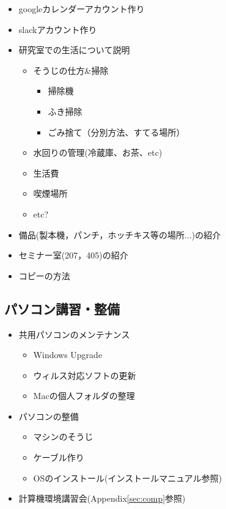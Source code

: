 \documentclass[twocolumn,11pt]{jsarticle}
\begin{document}
\begin{itemize}
\item googleカレンダーアカウント作り
\item slackアカウント作り
\item 研究室での生活について説明
  \begin{itemize}
  \item そうじの仕方\&掃除
    \begin{itemize}
    \item 掃除機
    \item ふき掃除
    \item ごみ捨て（分別方法、すてる場所）	
    \end{itemize}
  \item 水回りの管理(冷蔵庫、お茶、etc)
  \item 生活費
  \item 喫煙場所
  \item etc?
  \end{itemize}
\item 備品(製本機，パンチ，ホッチキス等の場所...)の紹介
\item セミナー室(207，405)の紹介
\item コピーの方法
\end{itemize}


\subsection{パソコン講習・整備}
\begin{itemize}
\item 共用パソコンのメンテナンス
  \begin{itemize}
  \item Windows Upgrade
  \item ウィルス対応ソフトの更新
  \item Macの個人フォルダの整理
  \end{itemize}

\item パソコンの整備
  \begin{itemize}
  \item マシンのそうじ
  \item ケーブル作り
  \item OSのインストール(インストールマニュアル参照)
  \end{itemize}
\item 計算機環境講習会(Appendix\ref{sec:comp}参照)
\end{itemize}
\end{document}
